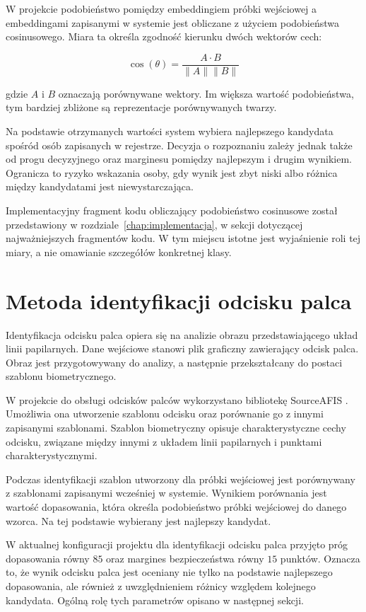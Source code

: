 W projekcie podobieństwo pomiędzy embeddingiem próbki wejściowej a embeddingami zapisanymi w systemie jest obliczane z użyciem podobieństwa cosinusowego. Miara ta określa zgodność kierunku dwóch wektorów cech:

\[
\cos(\theta) = \frac{A \cdot B}{\lVert A \rVert \lVert B \rVert}
\]

gdzie \(A\) i \(B\) oznaczają porównywane wektory. Im większa wartość podobieństwa, tym bardziej zbliżone są reprezentacje porównywanych twarzy.

Na podstawie otrzymanych wartości system wybiera najlepszego kandydata spośród osób zapisanych w rejestrze. Decyzja o rozpoznaniu zależy jednak także od progu decyzyjnego oraz marginesu pomiędzy najlepszym i drugim wynikiem. Ogranicza to ryzyko wskazania osoby, gdy wynik jest zbyt niski albo różnica między kandydatami jest niewystarczająca.

Implementacyjny fragment kodu obliczający podobieństwo cosinusowe został przedstawiony w rozdziale~\ref{chap:implementacja}, w sekcji dotyczącej najważniejszych fragmentów kodu. W tym miejscu istotne jest wyjaśnienie roli tej miary, a nie omawianie szczegółów konkretnej klasy.

\section{Metoda identyfikacji odcisku palca}

Identyfikacja odcisku palca opiera się na analizie obrazu przedstawiającego układ linii papilarnych. Dane wejściowe stanowi plik graficzny zawierający odcisk palca. Obraz jest przygotowywany do analizy, a następnie przekształcany do postaci szablonu biometrycznego.

W projekcie do obsługi odcisków palców wykorzystano bibliotekę SourceAFIS \cite{sourceafis}. Umożliwia ona utworzenie szablonu odcisku oraz porównanie go z innymi zapisanymi szablonami. Szablon biometryczny opisuje charakterystyczne cechy odcisku, związane między innymi z układem linii papilarnych i punktami charakterystycznymi.

Podczas identyfikacji szablon utworzony dla próbki wejściowej jest porównywany z szablonami zapisanymi wcześniej w systemie. Wynikiem porównania jest wartość dopasowania, która określa podobieństwo próbki wejściowej do danego wzorca. Na tej podstawie wybierany jest najlepszy kandydat.

W aktualnej konfiguracji projektu dla identyfikacji odcisku palca przyjęto próg dopasowania równy \(85\) oraz margines bezpieczeństwa równy \(15\) punktów. Oznacza to, że wynik odcisku palca jest oceniany nie tylko na podstawie najlepszego dopasowania, ale również z uwzględnieniem różnicy względem kolejnego kandydata. Ogólną rolę tych parametrów opisano w następnej sekcji.

